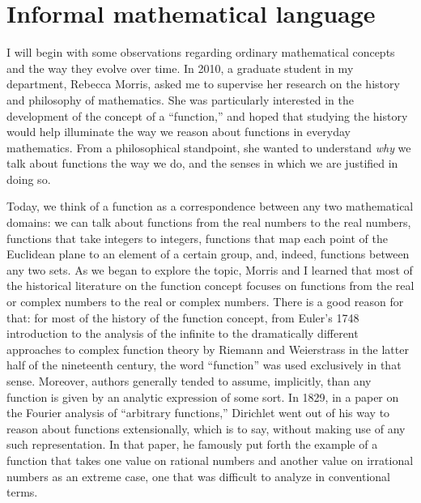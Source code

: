 \documentclass[12pt]{article}
\begin{document}
\section{Informal mathematical language}
\label{section:informal}

I will begin with some observations regarding ordinary mathematical concepts and the way they evolve over time. In 2010, a graduate student in my department, Rebecca Morris, asked me to supervise her research on the history and philosophy of mathematics. She was particularly interested in the development of the concept of a ``function,'' and hoped that studying the history would help illuminate the way we reason about functions in everyday mathematics. From a philosophical standpoint, she wanted to understand \emph{why} we talk about functions the way we do, and the senses in which we are justified in doing so.

Today, we think of a function as a correspondence between any two mathematical domains: we can talk about functions from the real numbers to the real numbers, functions that take integers to integers, functions that map each point of the Euclidean plane to an element of a certain group, and, indeed, functions between any two sets. As we began to explore the topic, Morris and I learned that most of the historical literature on the function concept focuses on functions from the real or complex numbers to the real or complex numbers. There is a good reason for that: for most of the history of the function concept, from Euler's 1748 introduction to the analysis of the infinite to the dramatically different approaches to complex function theory by Riemann and Weierstrass in the latter half of the nineteenth century, the word ``function'' was used exclusively in that sense. Moreover, authors generally tended to assume, implicitly, than any function is given by an analytic expression of some sort. In 1829, in a paper on the Fourier analysis of ``arbitrary functions,'' Dirichlet went out of his way to reason about functions extensionally, which is to say, without making use of any such representation. In that paper, he famously put forth the example of a function that takes one value on rational numbers and another value on irrational numbers as an extreme case, one that was difficult to analyze in conventional terms.
\end{document}
